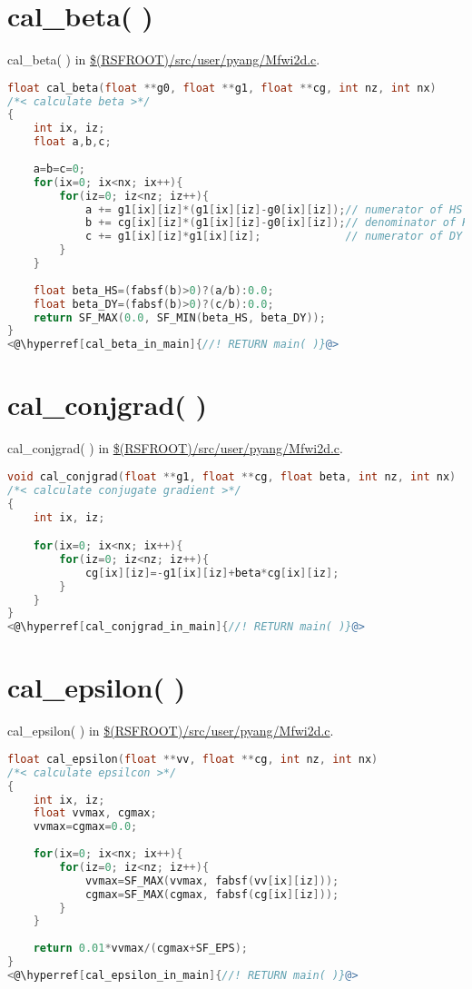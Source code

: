 \documentclass[a4paper,11pt]{article}
\theoremstyle{mytheor}
\begin{document}
\section*{cal\_beta( )}
cal\_beta( ) in \url{$(RSFROOT)/src/user/pyang/Mfwi2d.c}.
\begin{lstlisting}[label={cal_beta},language=C,tabsize=4,caption=cal\_beta( )]
float cal_beta(float **g0, float **g1, float **cg, int nz, int nx)
/*< calculate beta >*/
{
	int ix, iz;
	float a,b,c;
	
	a=b=c=0;
	for(ix=0; ix<nx; ix++){
		for(iz=0; iz<nz; iz++){
			a += g1[ix][iz]*(g1[ix][iz]-g0[ix][iz]);// numerator of HS
			b += cg[ix][iz]*(g1[ix][iz]-g0[ix][iz]);// denominator of HS,DY
			c += g1[ix][iz]*g1[ix][iz];				// numerator of DY
		}
	}
	
	float beta_HS=(fabsf(b)>0)?(a/b):0.0; 
	float beta_DY=(fabsf(b)>0)?(c/b):0.0;
	return SF_MAX(0.0, SF_MIN(beta_HS, beta_DY));
}
<@\hyperref[cal_beta_in_main]{//! RETURN main( )}@>
\end{lstlisting}

\section*{cal\_conjgrad( )}
cal\_conjgrad( ) in \url{$(RSFROOT)/src/user/pyang/Mfwi2d.c}.
\begin{lstlisting}[label={cal_conjgrad},language=C,tabsize=4,caption=cal\_conjgrad( )]
void cal_conjgrad(float **g1, float **cg, float beta, int nz, int nx)
/*< calculate conjugate gradient >*/
{
	int ix, iz;

	for(ix=0; ix<nx; ix++){
		for(iz=0; iz<nz; iz++){
			cg[ix][iz]=-g1[ix][iz]+beta*cg[ix][iz];
		}
	}
}
<@\hyperref[cal_conjgrad_in_main]{//! RETURN main( )}@>
\end{lstlisting}

\section*{cal\_epsilon( )}
cal\_epsilon( ) in \url{$(RSFROOT)/src/user/pyang/Mfwi2d.c}.
\begin{lstlisting}[label={cal_epsilon},language=C,tabsize=4,caption=cal\_epsilon( )]
float cal_epsilon(float **vv, float **cg, int nz, int nx)
/*< calculate epsilcon >*/
{
	int ix, iz;
	float vvmax, cgmax;
	vvmax=cgmax=0.0;
	
	for(ix=0; ix<nx; ix++){
		for(iz=0; iz<nz; iz++){
			vvmax=SF_MAX(vvmax, fabsf(vv[ix][iz]));
			cgmax=SF_MAX(cgmax, fabsf(cg[ix][iz]));
		}
	}
	
	return 0.01*vvmax/(cgmax+SF_EPS);
}
<@\hyperref[cal_epsilon_in_main]{//! RETURN main( )}@>
\end{lstlisting}
\end{document}
